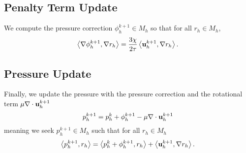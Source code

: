 \documentclass[letterpaper]{erdc}
\begin{document}
%
%
\subsection{Penalty Term Update}
We compute the pressure correction $\phi_h^{k+1}\in M_h$ so that for all $r_h\in M_h$,
\begin{equation}
  \left\langle \nabla\phi_h^{k+1}, \nabla r_h \right\rangle = \frac{3\chi}{2\tau}\left\langle \textbf{u}_h^{k+1}, \nabla r_h \right\rangle.
\end{equation}

%
%
\subsection{Pressure Update}
Finally, we update the pressure with the pressure correction and the rotational term $\mu\nabla\cdot\textbf{u}_h^{k+1}$
\begin{equation}
  p_h^{k+1} = p_h^{k} + \phi_h^{k+1} - \mu\nabla\cdot\textbf{u}_h^{k+1}
\end{equation}
meaning we seek $p_h^{k+1}\in M_h$ such that for all $r_h\in M_h$
\begin{equation}
  \left\langle p_h^{k+1}, r_h \right\rangle = \left\langle p_h^{k} + \phi_h^{k+1}, r_h \right\rangle + \left\langle \textbf{u}_h^{k+1}, \nabla r_h \right\rangle.
\end{equation}
\end{document}
